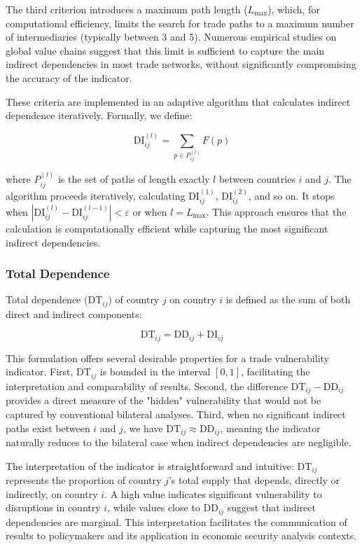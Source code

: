 \documentclass[final,1p,times,authoryear]{elsarticle}
\begin{document}
The third criterion introduces a maximum path length ($L_{\max}$), which, for computational efficiency, limits the search for trade paths to a maximum number of intermediaries (typically between 3 and 5). Numerous empirical studies on global value chains suggest that this limit is sufficient to capture the main indirect dependencies in most trade networks, without significantly compromising the accuracy of the indicator.

These criteria are implemented in an adaptive algorithm that calculates indirect dependence iteratively. Formally, we define:

\begin{equation}
\text{DI}_{ij}^{(l)} = \sum_{p\in P_{ij}^{(l)}} F(p)
\end{equation}

where $P_{ij}^{(l)}$ is the set of paths of length exactly $l$ between countries $i$ and $j$. The algorithm proceeds iteratively, calculating $\text{DI}_{ij}^{(1)}$, $\text{DI}_{ij}^{(2)}$, and so on. It stops when $|\text{DI}_{ij}^{(l)} - \text{DI}_{ij}^{(l-1)}| < \varepsilon$ or when $l = L_{\max}$. This approach ensures that the calculation is computationally efficient while capturing the most significant indirect dependencies.

\subsubsection{Total Dependence}

Total dependence ($\text{DT}_{ij}$) of country $j$ on country $i$ is defined as the sum of both direct and indirect components:

\begin{equation}
\text{DT}_{ij} = \text{DD}_{ij} + \text{DI}_{ij}
\end{equation}

This formulation offers several desirable properties for a trade vulnerability indicator. First, $\text{DT}_{ij}$ is bounded in the interval $[0, 1]$, facilitating the interpretation and comparability of results. Second, the difference $\text{DT}_{ij} - \text{DD}_{ij}$ provides a direct measure of the "hidden" vulnerability that would not be captured by conventional bilateral analyses. Third, when no significant indirect paths exist between $i$ and $j$, we have $\text{DT}_{ij} \approx \text{DD}_{ij}$, meaning the indicator naturally reduces to the bilateral case when indirect dependencies are negligible.

The interpretation of the indicator is straightforward and intuitive: $\text{DT}_{ij}$ represents the proportion of country $j$’s total supply that depends, directly or indirectly, on country $i$. A high value indicates significant vulnerability to disruptions in country $i$, while values close to $\text{DD}_{ij}$ suggest that indirect dependencies are marginal. This interpretation facilitates the communication of results to policymakers and its application in economic security analysis contexts.
\end{document}
